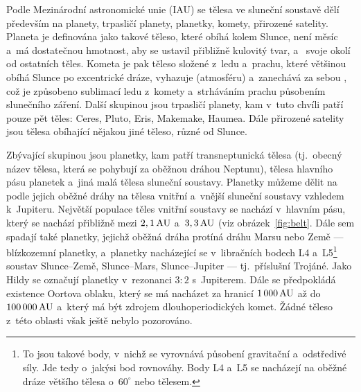 \documentclass[A4paper, 12pt, oneside]{book}
\begin{document}
Podle Mezinárodní astronomické unie (IAU) se tělesa ve sluneční soustavě dělí především na planety, trpasličí planety, planetky, komety, přirozené satelity. Planeta je definována jako takové těleso, které obíhá kolem Slunce, není měsíc a~má dostatečnou hmotnost, aby se ustavil přibližně kulovitý tvar, a~ svoje okolí od ostatních těles. Kometa je pak těleso složené z~ledu a~prachu, které většinou obíhá Slunce po excentrické dráze, vyhazuje  (atmosféru) a~zanechává za sebou , což je způsobeno sublimací ledu z~komety a~strháváním prachu působením slunečního záření. Další skupinou jsou trpasličí planety, kam v~tuto chvíli patří pouze pět těles: Ceres, Pluto, Eris, Makemake, Haumea. Dále přirozené satelity jsou tělesa obíhající nějakou jiné těleso, různé od Slunce.

Zbývající skupinou jsou planetky, kam patří transneptunická tělesa (tj.\ obecný název tělesa, která se pohybují za oběžnou dráhou Neptunu), tělesa hlavního pásu planetek a~jiná malá tělesa sluneční soustavy. Planetky můžeme dělit na podle jejich oběžné dráhy na tělesa vnitřní a~vnější sluneční soustavy vzhledem k~Jupiteru. Největší populace těles vnitřní soustavy se nachází v~hlavním pásu, který se nachází přibližně mezi $2,1\, {\rm AU}$ a~$3,3\, {\rm AU}$ (viz obrázek~\ref{fig:belt}. Dále sem spadají také planetky, jejichž oběžná dráha protíná dráhu Marsu nebo Země --- blízkozemní planetky, a~planetky nacházející se v~libračních bodech L4 a~L5\footnote{To jsou takové body, v~nichž se vyrovnává působení gravitační a~odstředivé síly. Jde tedy o~jakýsi bod rovnováhy. Body L4 a~L5 se nacházejí na oběžné dráze většího tělesa o~$60^\circ$  nebo  tělesem.} soustav Slunce--Země, Slunce--Mars, Slunce--Jupiter --- tj.\ příslušní Trojáné. Jako Hildy se označují planetky v~rezonanci $3:2$ s~Jupiterem. Dále se předpokládá existence Oortova oblaku, který se má nacházet za hranicí $1\,000\,{\rm AU}$ až do $100\,000\,{\rm AU}$ a~který má být zdrojem dlouhoperiodických komet. Žádné těleso z~této oblasti však ještě nebylo pozorováno.
\end{document}
